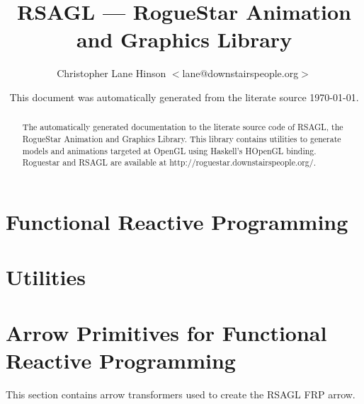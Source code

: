 \documentclass{article}
\author{Christopher Lane Hinson $<$lane@downstairspeople.org$>$}
\title{ RSAGL --- RogueStar Animation and Graphics Library }
\date{ This document was automatically generated from the literate source \today. }
\begin{document}
\maketitle

\begin{abstract}
The automatically generated documentation to the literate source code of RSAGL, 
the RogueStar Animation and Graphics Library.  This library contains utilities
to generate models and animations targeted at OpenGL using Haskell's HOpenGL
binding.  Roguestar and RSAGL are available at http://roguestar.downstairspeople.org/.
\end{abstract}

\tableofcontents

\part{Functional Reactive Programming}

\part{Utilities}



\part{Arrow Primitives for Functional Reactive Programming}

This section contains arrow transformers used to create the RSAGL FRP arrow.





\end{document}
